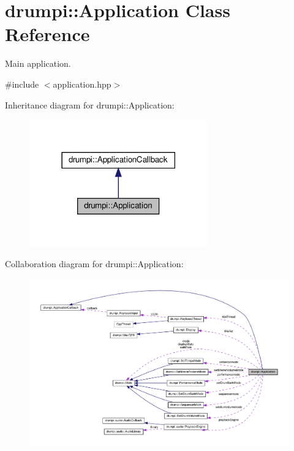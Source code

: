 \hypertarget{classdrumpi_1_1Application}{}\section{drumpi\+:\+:Application Class Reference}
\label{classdrumpi_1_1Application}


Main application.  




{\ttfamily \#include $<$application.\+hpp$>$}



Inheritance diagram for drumpi\+:\+:Application\+:
\nopagebreak
\begin{figure}[H]
\begin{center}
\leavevmode
\includegraphics[width=218pt]{classdrumpi_1_1Application__inherit__graph}
\end{center}
\end{figure}


Collaboration diagram for drumpi\+:\+:Application\+:
\nopagebreak
\begin{figure}[H]
\begin{center}
\leavevmode
\includegraphics[width=350pt]{classdrumpi_1_1Application__coll__graph}
\end{center}
\end{figure}
